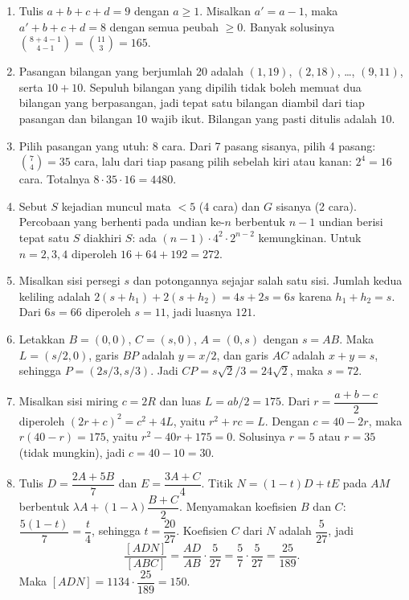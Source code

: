 \documentclass[12pt]{scrartcl}
\begin{document}
\begin{enumerate}
	\item Tulis $a+b+c+d=9$ dengan $a \ge 1$. Misalkan $a'=a-1$, maka
	$a'+b+c+d=8$ dengan semua peubah $\ge 0$. Banyak solusinya
	$\binom{8+4-1}{4-1}=\binom{11}{3}=\boxed{165}$.

	\item Pasangan bilangan yang berjumlah 20 adalah $(1,19)$, $(2,18)$, \dots, $(9,11)$,
	serta $10+10$. Sepuluh bilangan yang dipilih tidak boleh memuat dua bilangan yang
	berpasangan, jadi tepat satu bilangan diambil dari tiap pasangan dan bilangan 10
	wajib ikut. Bilangan yang pasti ditulis adalah $\boxed{10}$.

	\item Pilih pasangan yang utuh: 8 cara. Dari 7 pasang sisanya, pilih 4 pasang:
	$\binom{7}{4}=35$ cara, lalu dari tiap pasang pilih sebelah kiri atau kanan: $2^{4}=16$ cara.
	Totalnya $8\cdot 35\cdot 16=\boxed{4480}$.

	\item Sebut $S$ kejadian muncul mata $<5$ (4 cara) dan $G$ sisanya (2 cara).
	Percobaan yang berhenti pada undian ke-$n$ berbentuk $n-1$ undian berisi tepat satu $S$
	diakhiri $S$: ada $(n-1)\cdot 4^{2}\cdot 2^{n-2}$ kemungkinan.
	Untuk $n=2,3,4$ diperoleh $16+64+192=\boxed{272}$.

	\item Misalkan sisi persegi $s$ dan potongannya sejajar salah satu sisi.
	Jumlah kedua keliling adalah $2(s+h_{1})+2(s+h_{2})=4s+2s=6s$ karena $h_{1}+h_{2}=s$.
	Dari $6s=66$ diperoleh $s=11$, jadi luasnya $\boxed{121}$.

	\item Letakkan $B=(0,0)$, $C=(s,0)$, $A=(0,s)$ dengan $s=AB$.
	Maka $L=(s/2,0)$, garis $BP$ adalah $y=x/2$, dan garis $AC$ adalah $x+y=s$,
	sehingga $P=(2s/3,s/3)$. Jadi $CP=s\sqrt{2}/3=24\sqrt{2}$, maka $s=\boxed{72}$.

	\item Misalkan sisi miring $c=2R$ dan luas $L=ab/2=175$.
	Dari $r=\dfrac{a+b-c}{2}$ diperoleh $(2r+c)^{2}=c^{2}+4L$, yaitu $r^{2}+rc=L$.
	Dengan $c=40-2r$, maka $r(40-r)=175$, yaitu $r^{2}-40r+175=0$.
	Solusinya $r=5$ atau $r=35$ (tidak mungkin), jadi $c=40-10=\boxed{30}$.

	\item Tulis $D=\dfrac{2A+5B}{7}$ dan $E=\dfrac{3A+C}{4}$.
	Titik $N=(1-t)D+tE$ pada $AM$ berbentuk $\lambda A+(1-\lambda)\dfrac{B+C}{2}$.
	Menyamakan koefisien $B$ dan $C$: $\dfrac{5(1-t)}{7}=\dfrac{t}{4}$,
	sehingga $t=\dfrac{20}{27}$. Koefisien $C$ dari $N$ adalah $\dfrac{5}{27}$, jadi
	\[ \frac{[ADN]}{[ABC]}=\frac{AD}{AB}\cdot\frac{5}{27}
	=\frac{5}{7}\cdot\frac{5}{27}=\frac{25}{189}. \]
	Maka $[ADN]=1134\cdot\dfrac{25}{189}=\boxed{150}$.
\end{enumerate}
\end{document}
